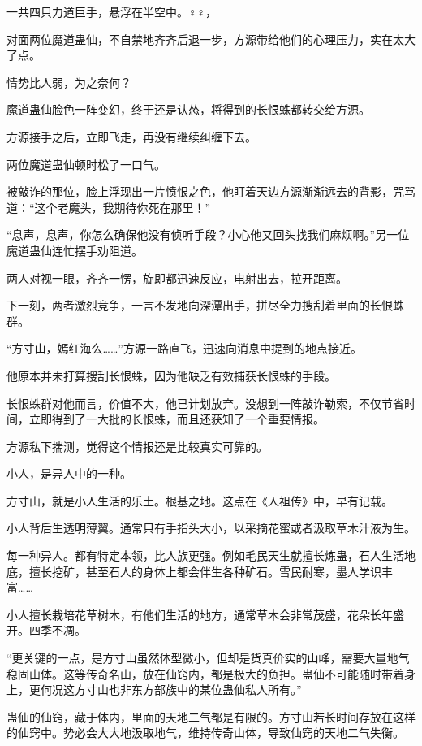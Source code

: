 
\begin{this_body}

一共四只力道巨手，悬浮在半空中。♀♀，

对面两位魔道蛊仙，不自禁地齐齐后退一步，方源带给他们的心理压力，实在太大了点。

情势比人弱，为之奈何？

魔道蛊仙脸色一阵变幻，终于还是认怂，将得到的长恨蛛都转交给方源。

方源接手之后，立即飞走，再没有继续纠缠下去。

两位魔道蛊仙顿时松了一口气。

被敲诈的那位，脸上浮现出一片愤恨之色，他盯着天边方源渐渐远去的背影，咒骂道：“这个老魔头，我期待你死在那里！”

“息声，息声，你怎么确保他没有侦听手段？小心他又回头找我们麻烦啊。”另一位魔道蛊仙连忙摆手劝阻道。

两人对视一眼，齐齐一愣，旋即都迅速反应，电射出去，拉开距离。

下一刻，两者激烈竞争，一言不发地向深潭出手，拼尽全力搜刮着里面的长恨蛛群。

“方寸山，嫣红海么……”方源一路直飞，迅速向消息中提到的地点接近。

他原本并未打算搜刮长恨蛛，因为他缺乏有效捕获长恨蛛的手段。

长恨蛛群对他而言，价值不大，他已计划放弃。没想到一阵敲诈勒索，不仅节省时间，立即得到了一大批的长恨蛛，而且还获知了一个重要情报。

方源私下揣测，觉得这个情报还是比较真实可靠的。

小人，是异人中的一种。

方寸山，就是小人生活的乐土。根基之地。这点在《人祖传》中，早有记载。

小人背后生透明薄翼。通常只有手指头大小，以采摘花蜜或者汲取草木汁液为生。

每一种异人。都有特定本领，比人族更强。例如毛民天生就擅长炼蛊，石人生活地底，擅长挖矿，甚至石人的身体上都会伴生各种矿石。雪民耐寒，墨人学识丰富……

小人擅长栽培花草树木，有他们生活的地方，通常草木会非常茂盛，花朵长年盛开。四季不凋。

“更关键的一点，是方寸山虽然体型微小，但却是货真价实的山峰，需要大量地气稳固山体。这等传奇名山，放在仙窍内，都是极大的负担。蛊仙不可能随时带着身上，更何况这方寸山也非东方部族中的某位蛊仙私人所有。”

蛊仙的仙窍，藏于体内，里面的天地二气都是有限的。方寸山若长时间存放在这样的仙窍中。势必会大大地汲取地气，维持传奇山体，导致仙窍的天地二气失衡。


\end{this_body}
